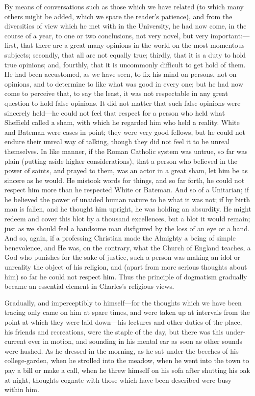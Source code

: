 By means of conversations such as those which we have related (to
which many others might be added, which we spare the reader's
patience), and from the diversities of view which he met with in the
University, he had now come, in the course of a year, to one or two
conclusions, not very novel, but very important:—first, that there
are a great many opinions in the world on the most momentous subjects;
secondly, that all are not equally true; thirdly, that it is a duty to
hold true opinions; and, fourthly, that it is uncommonly difficult to
get hold of them. He had been accustomed, as we have seen, to fix his
mind on persons, not on opinions, and to determine to like what
was good in every one; but he had now come to perceive that, to say
the least, it was not respectable in any great question to hold false
opinions. It did not matter that such false opinions were sincerely
held—he could not feel that respect for a person who held what
Sheffield called a sham, with which he regarded him who held a
reality. White and Bateman were cases in point; they were very good
fellows, but he could not endure their unreal way of talking, though
they did not feel it to be unreal themselves. In like manner, if the
Roman Catholic system was untrue, so far was plain (putting aside
higher considerations), that a person who believed in the power of
saints, and prayed to them, was an actor in a great sham, let him be
as sincere as he would. He mistook words for things, and so far forth,
he could not respect him more than he respected White or Bateman. And
so of a Unitarian; if he believed the power of unaided human nature to
be what it was not; if by birth man is fallen, and he thought him
upright, he was holding an absurdity. He might redeem and cover this
blot by a thousand excellences, but a blot it would remain; just as we
should feel a handsome man disfigured by the loss of an eye or a hand.
And so, again, if a professing Christian made the Almighty a being of
simple benevolence, and He was, on the contrary, what the Church of
England teaches, a God who punishes for the sake of justice, such a
person was making an idol or unreality the object of his religion, and
(apart from more serious thoughts about him) so far he could not
respect him. Thus the principle of dogmatism gradually became an
essential element in Charles's religious views.

Gradually, and imperceptibly to himself—for the thoughts which we
have been tracing only came on him at spare times, and were taken up
at intervals from the point at which they were laid down—his
lectures and other duties of the place, his friends and recreations,
were the staple of the day, but there was this under-current ever in
motion, and sounding in his mental ear as soon as other sounds were
hushed. As he dressed in the morning, as he sat under the beeches of
his college-garden, when he strolled into the meadow, when he went
into the town to pay a bill or make a call, when he threw himself on
his sofa after shutting his oak at night, thoughts cognate with those
which have been described were busy within him.

